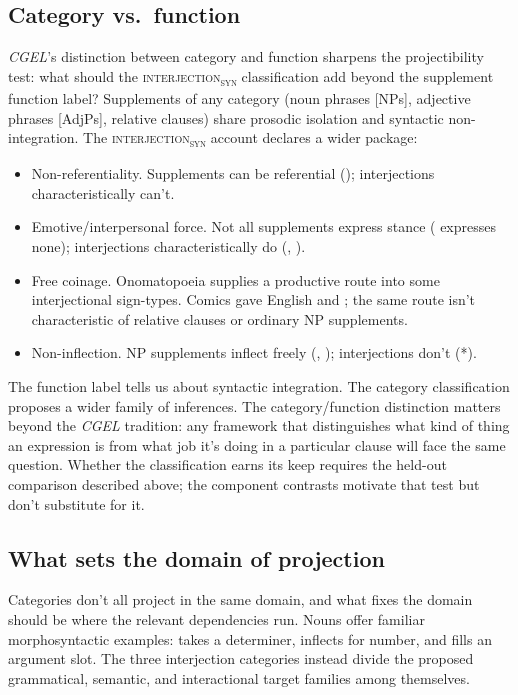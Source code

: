 \documentclass[12pt]{article}
\newcommand{\intj}[1]{\textsc{interjection\textsubscript{#1}}}
\begin{document}
\subsection{Category vs.\ function}

\textit{CGEL}'s distinction between category and function sharpens the
projectibility test: what should the \intj{syn} classification add
beyond the supplement function label? Supplements of any category
(noun phrases [NPs], adjective phrases [AdjPs], relative clauses) share
prosodic isolation and syntactic
non-integration. The \intj{syn} account declares a wider package:

\begin{itemize}
\item Non-referentiality. Supplements can be referential
  (); interjections
  characteristically can't.
\item Emotive/interpersonal force. Not all supplements express
  stance ( expresses none); interjections
  characteristically do (, ).
\item Free coinage. Onomatopoeia supplies a productive route into some
  interjectional sign-types. Comics gave English  and
  ; the same route isn't characteristic of relative clauses or
  ordinary NP supplements.
\item Non-inflection. NP supplements inflect freely
  (, ); interjections don't
  (*).
\end{itemize}

The function label tells us about syntactic integration. The category
classification proposes a wider family of inferences. The category/function distinction matters
beyond the \textit{CGEL} tradition: any framework that distinguishes what kind of
thing an expression is from what job it's doing in a particular clause
will face the same question. Whether the classification earns its keep
requires the held-out comparison described above; the component contrasts
motivate that test but don't substitute for it.

\subsection{What sets the domain of projection}\label{sec:proj-domain}

Categories don't all project in the same domain, and what fixes the domain
should be where the relevant dependencies run. Nouns offer familiar
morphosyntactic examples:  takes a determiner, inflects for
number, and fills an argument slot. The three interjection categories instead
divide the proposed grammatical, semantic, and interactional target families
among themselves.
\end{document}
